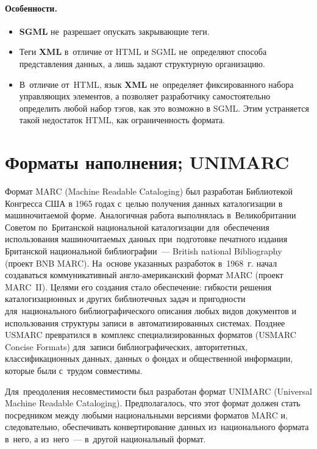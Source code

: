\documentclass[12pt]{article}
\theoremstyle{definition}
\theoremstyle{remark}
\numberwithin{equation}{section}
\begin{document}
\paragraph{Особенности.}
\begin{itemize}
	\item \textbf{SGML} не~разрешает опускать закрывающие теги.
	\item Теги \textbf{XML} в~отличие от HTML и SGML не~определяют
    способа представления данных, а лишь задают структурную организацию.
	\item В~отличие от~HTML, язык \textbf{XML} не~определяет
    фиксированного набора управляющих элементов, а позволяет
    разработчику самостоятельно определить любой набор тэгов, как это
    возможно в SGML. Этим устраняется такой недостаток HTML, как
    ограниченность формата.
\end{itemize}

\section{Форматы наполнения; UNIMARC}
Формат MARC (Machine Readable Cataloging) был разработан Библиотекой
Конгресса США в 1965 годах с~целью получения данных
каталогизации в машиночитаемой форме. Аналогичная работа выполнялась
в~Великобритании Советом по~Британской национальной каталогизации
для~обеспечения использования машиночитаемых данных при~подготовке
печатного издания Британской национальной библиографии~--- British
national Bibliography (проект BNB MARC). На~основе указанных разработок
в~1968~г. начал создаваться коммуникативный англо\nobreakdash-американский
формат MARC (проект MARC~II). Целями его создания стало обеспечение:
гибкости решения каталогизационных и других библиотечных задач и пригодности
для~национального библиографического описания любых видов документов
и использования структуры записи в~автоматизированных системах.
Позднее USMARC превратился в~комплекс специализированных форматов
(USMARC Concise Formats) для~записи библиографических, авторитетных,
классификационных данных, данных о фондах и общественной информации,
которые были с~трудом совместимы.

Для~преодоления несовместимости был разработан формат UNIMARC
(Universal Machine Readable Cataloging). Предполагалось, что этот
формат должен стать посредником между любыми национальными версиями
форматов MARC и, следовательно, обеспечивать конвертирование данных
из~национального формата в~него, а из~него~--- в~другой национальный
формат.
\end{document}
